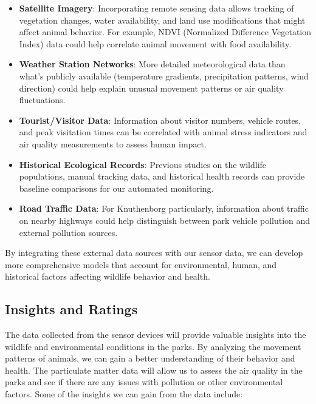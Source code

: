 \begin{itemize}
  \item \textbf{Satellite Imagery}: Incorporating remote sensing data allows tracking of vegetation changes, water availability, and land use modifications that might affect animal behavior. For example, NDVI (Normalized Difference Vegetation Index) data could help correlate animal movement with food availability.
  
  \item \textbf{Weather Station Networks}: More detailed meteorological data than what's publicly available (temperature gradients, precipitation patterns, wind direction) could help explain unusual movement patterns or air quality fluctuations.
  
  \item \textbf{Tourist/Visitor Data}: Information about visitor numbers, vehicle routes, and peak visitation times can be correlated with animal stress indicators and air quality measurements to assess human impact.
  
  \item \textbf{Historical Ecological Records}: Previous studies on the wildlife populations, manual tracking data, and historical health records can provide baseline comparisons for our automated monitoring.
  
  \item \textbf{Road Traffic Data}: For Knuthenborg particularly, information about traffic on nearby highways could help distinguish between park vehicle pollution and external pollution sources.
\end{itemize}

By integrating these external data sources with our sensor data, we can develop more comprehensive models that account for environmental, human, and historical factors affecting wildlife behavior and health.

\subsection{Insights and Ratings}
The data collected from the sensor devices will provide valuable insights into the wildlife and environmental conditions in the parks. By analyzing the movement patterns of animals, we can gain a better understanding of their behavior and health. The particulate matter data will allow us to assess the air quality in the parks and see if there are any issues with pollution or other environmental factors. Some of the insights we can gain from the data include:

